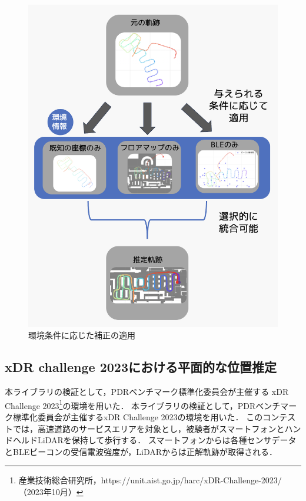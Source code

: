 \documentclass[a4paper, 10pt, twocolumn]{jarticle}
\begin{document}
\begin{figure}[h]
    \centering
    \includegraphics[width=\linewidth]{image/integrate4.jpg}
    \caption{環境条件に応じた補正の適用}
    \label{fig:corrector-class}
\end{figure}



\subsection{xDR challenge 2023における平面的な位置推定}
本ライブラリの検証として，PDRベンチマーク標準化委員会が主催する
xDR Challenge 2023\footnote{産業技術総合研究所，https://unit.aist.go.jp/harc/xDR-Challenge-2023/（2023年10月）}の環境を用いた．
本ライブラリの検証として，PDRベンチマーク標準化委員会が主催するxDR Challenge 2023の環境を用いた．
このコンテストでは，高速道路のサービスエリアを対象とし，被験者がスマートフォンとハンドヘルドLiDARを保持して歩行する．
スマートフォンからは各種センサデータとBLEビーコンの受信電波強度が，LiDARからは正解軌跡が取得される．
\end{document}
